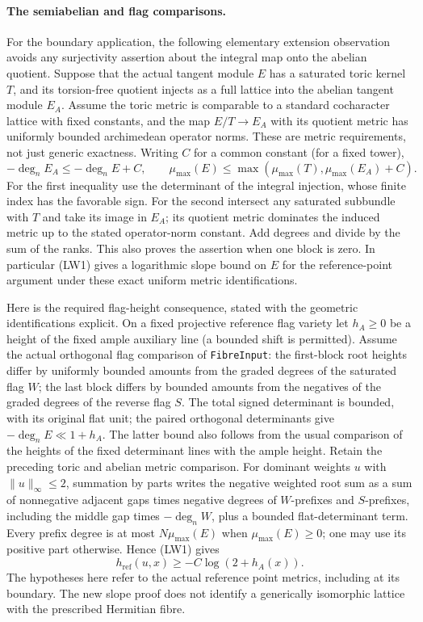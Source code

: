 \paragraph{The semiabelian and flag comparisons.}
For the boundary application, the following elementary
extension observation avoids any surjectivity assertion about
the integral map onto the abelian quotient. Suppose that the
actual tangent module \(E\) has a saturated toric kernel \(T\),
and its torsion-free quotient injects as a full lattice into
the abelian tangent module \(E_A\). Assume the toric metric
is comparable to a standard cocharacter lattice with fixed
constants, and the map \(E/T\to E_A\) with its quotient metric
has uniformly bounded archimedean operator norms. These
are metric requirements, not just generic exactness.
Writing \(C\) for a common constant (for a fixed tower),
\[
 -\deg_n E_A\le-\deg_n E+C,\qquad
 \mu_{\max}(E)\le
       \max(\mu_{\max}(T),\mu_{\max}(E_A)+C).
\]
For the first inequality use the determinant of the integral
injection, whose finite index has the favorable sign.
For the second intersect any saturated subbundle with \(T\)
and take its image in \(E_A\); its quotient metric dominates
the induced metric up to the stated operator-norm constant.
Add degrees and divide by the sum of the ranks.
This also proves the assertion when one block is zero.
In particular (LW1) gives a logarithmic slope bound on
\(E\) for the reference-point argument under these exact
uniform metric identifications.

Here is the required flag-height consequence, stated with
the geometric identifications explicit. On a fixed projective
reference flag variety let \(h_A\ge0\) be a height of the fixed
ample auxiliary line (a bounded shift is permitted).
Assume the actual orthogonal flag comparison of
\texttt{FibreInput}:
the first-block root heights differ by uniformly bounded
amounts from the graded degrees of the saturated flag \(W\);
the last block differs by bounded amounts from the negatives
of the graded degrees of the reverse flag \(S\).
The total signed determinant is bounded, with its original
flat unit; the paired orthogonal determinants give
\(-\deg_n E\ll1+h_A\). The latter bound also follows from
the usual comparison of the heights of the fixed determinant
lines with the ample height. Retain the preceding toric and
abelian metric comparison. For dominant weights \(u\) with
\(\|u\|_\infty\le2\), summation by parts writes the negative
weighted root sum as a sum of nonnegative adjacent gaps
times negative degrees of \(W\)-prefixes and \(S\)-prefixes,
including the middle gap times \(-\deg_n W\), plus a bounded
flat-determinant term. Every prefix degree is at most
\(N\mu_{\max}(E)\) when \(\mu_{\max}(E)\ge0\);
one may use its positive part otherwise.
Hence (LW1) gives
\[
       h_{\mathrm{ref}}(u,x)\ge-C\log(2+h_A(x)).        \tag{LW4}
\]
The hypotheses here refer to the actual reference point
metrics, including at its boundary. The new slope proof
does not identify a generically isomorphic lattice with
the prescribed Hermitian fibre.

